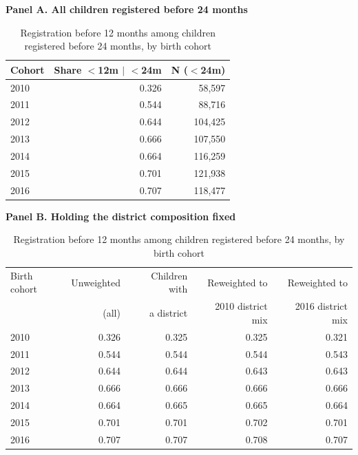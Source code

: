 \begin{table}[htbp]\centering
\caption{Registration before 12 months among children registered before 24 months, by birth cohort}
\label{tab:P5timing}
\label{tab:districtmix}
\footnotesize
\par\medskip\textbf{Panel A. All children registered before 24 months}\par\smallskip
\begin{tabular}{lrr}
\toprule
Cohort & Share $<$12m $\mid$ $<$24m & N ($<$24m) \\
\midrule
2010 & 0.326 & 58,597 \\
2011 & 0.544 & 88,716 \\
2012 & 0.644 & 104,425 \\
2013 & 0.666 & 107,550 \\
2014 & 0.664 & 116,259 \\
2015 & 0.701 & 121,938 \\
2016 & 0.707 & 118,477 \\
\bottomrule
\end{tabular}
\par\medskip\textbf{Panel B. Holding the district composition fixed}\par\smallskip
\begin{tabular}{lrrrr}
\toprule
Birth cohort & Unweighted & Children with & Reweighted to & Reweighted to \\
 & (all) & a district & 2010 district mix & 2016 district mix \\
\midrule
2010 & 0.326 & 0.325 & 0.325 & 0.321 \\
2011 & 0.544 & 0.544 & 0.544 & 0.543 \\
2012 & 0.644 & 0.644 & 0.643 & 0.643 \\
2013 & 0.666 & 0.666 & 0.666 & 0.666 \\
2014 & 0.664 & 0.665 & 0.665 & 0.664 \\
2015 & 0.701 & 0.701 & 0.702 & 0.701 \\
2016 & 0.707 & 0.707 & 0.708 & 0.707 \\
\bottomrule
\end{tabular}
\end{table}
